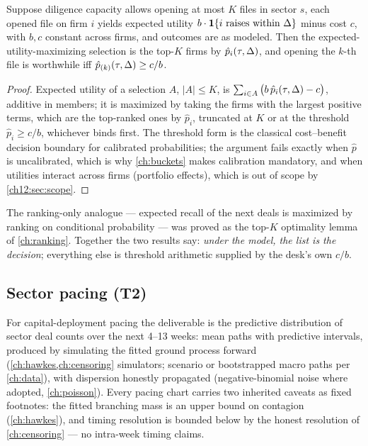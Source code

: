 \begin{proposition}\label{prop:ch12:topk}
Suppose diligence capacity allows opening at most $K$ files in sector
$s$, each opened file on firm $i$ yields expected utility $b \cdot
\mathbf{1}\{i \text{ raises within } \Delta\}$ minus cost $c$, with $b, c$
constant across firms, and outcomes are as modeled. Then the expected-utility-maximizing
selection is the top-$K$ firms by $\hat p_i(\tau,\Delta)$, and opening
the $k$-th file is worthwhile iff $\hat p_{(k)}(\tau,\Delta) \ge c/b$.
\end{proposition}

\begin{proof}
Expected utility of a selection $A$, $|A| \le K$, is $\sum_{i \in A}
\big(b\, \hat p_i(\tau,\Delta) - c\big)$, additive in members; it is
maximized by taking the firms with the largest positive terms, which are
the top-ranked ones by $\hat p_i$, truncated at $K$ or at the threshold
$\hat p_i \ge c/b$, whichever binds first. The threshold form is the
classical cost--benefit decision boundary for calibrated probabilities;
the argument fails exactly when $\hat p$ is uncalibrated, which is why
\cref{ch:buckets} makes calibration mandatory, and when utilities
interact across firms (portfolio effects), which is out of scope by
\cref{ch12:sec:scope}.
\end{proof}

The ranking-only analogue --- expected recall of the next deals is
maximized by ranking on conditional probability --- was proved as the
top-$K$ optimality lemma of \cref{ch:ranking}. Together the two results
say: \emph{under the model, the list is the decision}; everything else
is threshold arithmetic supplied by the desk's own $c/b$.

\subsection{Sector pacing (T2)}

For capital-deployment pacing the deliverable is the predictive
distribution of sector deal counts over the next 4--13 weeks: mean paths
with predictive intervals, produced by simulating the fitted ground
process forward (\cref{ch:hawkes,ch:censoring} simulators; scenario or
bootstrapped macro paths per \cref{ch:data}), with dispersion honestly
propagated (negative-binomial noise where adopted, \cref{ch:poisson}).
Every pacing chart carries two inherited caveats as fixed footnotes: the
fitted branching mass is an upper bound on contagion
(\cref{ch:hawkes}), and timing resolution is bounded below by the honest
resolution of \cref{ch:censoring} --- no intra-week timing claims.

